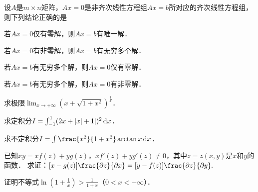 \documentclass[plain,noanswer,medmath]{../../template/jnuexam}
\begin{document}
\begin{problem}
设$A$是$m \times n$矩阵，$Ax = 0$是非齐次线性方程组$Ax = b$所对应的齐次线性方程组，
则下列结论正确的是\pickout{}
\begin{abcd}
\item 若$Ax = 0$仅有零解，则$Ax = b$有唯一解．
\item 若$Ax = 0$有非零解，则$Ax = b$有无穷多个解．
\item 若$Ax = b$有无穷多个解，则$Ax = 0$仅有零解．
\item 若$Ax = b$有无穷多个解，则$Ax = 0$有非零解．
\end{abcd}
\end{problem}





\begin{problem}
求极限$\lim_{x \to +\infty} (x + \sqrt{1 + x^2})^{\frac{1}{x}}$．
\end{problem}



\begin{problem}
求定积分$I = \int_{-1}^1(2x + |x| + 1|)^2 \mathop{}\!\mathrm{d} x$．
\end{problem}



\begin{problem}
求不定积分$I = \int \frac{x^2}{1 + x^2} \arctan x\dx$．
\end{problem}



\begin{problem}
已知$xy = xf(z) + yg(z)$，$xf'(z) + yg'(z) \ne 0$，其中$z = z(x,y)$是$x$和$y$的函数．
求证：$[x - g(z)]\frac{\pdz}{\pdx} = [y - f(z)]\frac{\pdz}{\pdy}.$
\end{problem}



%



%



\begin{problem}
证明不等式$\ln \left(1 + \frac{1}{x} \right) > \frac{1}{1 + x}$（$0 < x < +\infty$）．
\end{problem}
\end{document}
